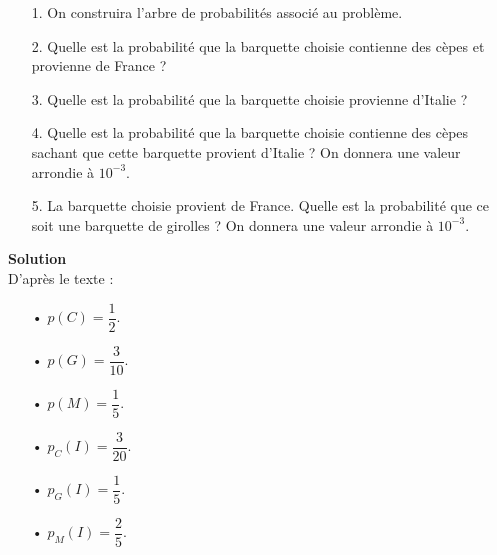 \begin{itemize}
\item[1.] On construira l'arbre de probabilités associé au problème. \\

\item[2.] Quelle est la probabilité que la barquette choisie contienne des cèpes et provienne de France ? \\

\item[3.] Quelle est la probabilité que la barquette choisie provienne d'Italie ? \\

\item[4.] Quelle est la probabilité que la barquette choisie contienne des cèpes sachant que cette barquette provient d'Italie ? On donnera une valeur arrondie à $10^{-3}$. \\

\item[5.] La barquette choisie provient de France. Quelle est la probabilité que ce soit une barquette de girolles ? On donnera une valeur arrondie à $10^{-3}$. 
\end{itemize}

\vspace*{.3cm}

\textbf{Solution} \\

D'après le texte : \\

\begin{itemize}
\item[•] $p\left(C\right) = \dfrac{1}{2}$. \\
\item[•] $p\left(G\right) = \dfrac{3}{10}$. \\
\item[•] $p\left(M\right) = \dfrac{1}{5}$. \\
\item[•] $p_C\left(I\right) = \dfrac{3}{20}$. \\
\item[•] $p_G\left(I\right) = \dfrac{1}{5}$. \\
\item[•] $p_M\left(I\right) = \dfrac{2}{5}$. 
\end{itemize}

\newpage


